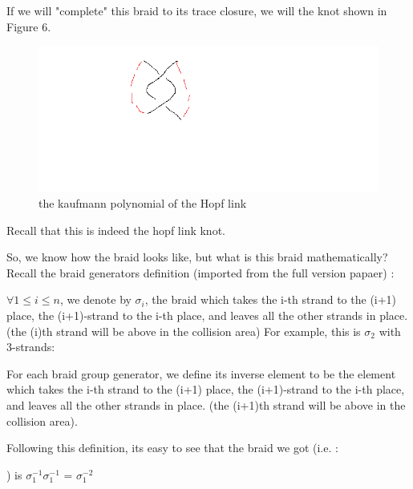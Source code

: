 \documentclass{article}
\begin{document}
If we will "complete" this braid to its trace closure, we will the knot shown in Figure 6.
\begin{figure}
\includegraphics[scale=0.7]{braid_of_hopf_link} 
\caption{the kaufmann polynomial of the Hopf link}
\end{figure}

Recall that this is indeed the hopf link knot.

So, we know how the braid looks like, but what is this braid mathematically? Recall the braid generators definition (imported from the full version papaer) : 

$\forall 1\leq i \leq n$, we denote by $\sigma_{i}$, the braid which takes the i-th strand
to the (i+1) place, the (i+1)-strand to the i-th place, and leaves all the other strands in place.(the (i)th strand will be above in the collision area) 
For example, this is $\sigma_{2}$ with 3-strands:
\begin{center}
\end{center}

For each braid group generator, we define its inverse element to be the element which takes the i-th strand
to the (i+1) place, the (i+1)-strand to the i-th place, and leaves all the other strands in place. (the (i+1)th strand will be above in the collision area).

Following this definition, its easy to see that the braid we got (i.e. : \begin{center}
\end{center} )
is $\sigma_{1}^{-1}\sigma_{1}^{-1}$ = $\sigma_{1}^{-2}$
\end{document}
